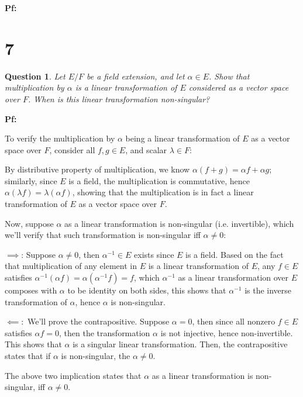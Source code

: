 \documentclass{article}
\newtheorem{question}{Question}
\begin{document}
\textbf{Pf:}

\break

\section*{7}
\begin{myBox}[]{}
    \begin{question}
        Let $E/F$ be a field extension, and let $\alpha\in E$. Show that multiplication by $\alpha$ is a
        linear transformation of $E$ considered as a vector space over $F$. When is this linear
        transformation non-singular?
    \end{question}
\end{myBox}

\textbf{Pf:}

To verify the multiplication by $\alpha$ being a linear transformation of $E$ as a vector space over $F$, consider all $f,g\in E$, and scalar $\lambda\in F$:

By distributive property of multiplication, we know $\alpha(f+g)=\alpha f+\alpha g$; similarly, since $E$ is a field, the multiplication is commutative, hence $\alpha(\lambda f)=\lambda (\alpha f)$,
showing that the multiplication is in fact a linear transformation of $E$ as a vector space over $F$.

\hfil

Now, suppose $\alpha$ as a linear transformation is non-singular (i.e. invertible), which we'll verify that such transformation is non-singular iff $\alpha\neq 0$:

$\implies$: Suppose $\alpha\neq 0$, then $\alpha^{-1}\in E$ exists since $E$ is a field. Based on the fact that multiplication of any element in $E$ is a linear transformation of $E$,
any $f\in E$ satisfies $\alpha^{-1}(\alpha f) = \alpha(\alpha^{-1}f)=f$, which $\alpha^{-1}$ as a linear transformation over $E$ composes with $\alpha$ to be identity on both sides,
this shows that $\alpha^{-1}$ is the inverse transformation of $\alpha$, hence $\alpha$ is non-singular.

$\impliedby:$ We'll prove the contrapositive. Suppose $\alpha=0$, then since all nonzero $f\in E$ satisfies $\alpha f = 0$, then the transformation $\alpha$ is not injective,
hence non-invertible. This shows that $\alpha$ is a singular linear transformation.
Then, the contrapositive states that if $\alpha$ is non-singular, the $\alpha\neq 0$.

The above two implication states that $\alpha$ as a linear transformation is non-singular, iff $\alpha\neq 0$.
\end{document}
